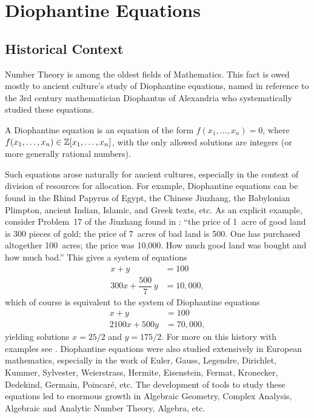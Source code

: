 \chapter{Diophantine Equations\label{ch:dioeq}}
\pagestyle{fancy}

\section{Historical Context}

Number Theory is among the oldest fields of Mathematics. This fact is owed mostly to ancient culture's study of Diophantine equations, named in reference to the 3rd century mathematician Diophantus of Alexandria who systematically studied these equations.


\begin{dfn}
A Diophantine equation is an equation of the form $f(x_1,\ldots,x_n)= 0$, where $f(x_1,\ldots,x_n) \in \mathbb{Z}[x_1,\ldots,x_n]$, with the only allowed solutions are integers (or more generally rational numbers).
\end{dfn}


Such equations arose naturally for ancient cultures, especially in the context of division of resources for allocation. For example, Diophantine equations can be found in the Rhind Papyrus of Egypt, the Chinese Jiuzhang, the Babylonian Plimpton, ancient Indian, Islamic, and Greek texts, etc. As an explicit example, consider Problem~17 of the Jiuzhang found in \cite{vogel68}: ``the price of 1~acre of good land is 300 pieces of gold; the price of 7~acres of bad land is 500. One has purchased altogether 100~acres; the price was 10,000. How much good land was bought and how much bad.'' This gives a system of equations
	\[
	\begin{aligned}
	x + y&= 100 \\
	300x + \dfrac{500}{7}\,y&= 10,000,
	\end{aligned}
	\]
which of course is equivalent to the system of Diophantine equations
	\[
	\begin{aligned}
	x + y&= 100 \\
	2100x + 500y&= 70,000,
	\end{aligned}
	\]
yielding solutions $x= 25/2$ and $y= 175/2$. For more on this history with examples see \cite{katz09}. Diophantine equations were also studied extensively in European mathematics, especially in the work of Euler, Gauss, Legendre, Dirichlet, Kummer, Sylvester, Weierstrass, Hermite, Eisenstein, Fermat, Kronecker, Dedekind, Germain, Poincar\'e, etc. The development of tools to study these equations led to enormous growth in Algebraic Geometry, Complex Analysis, Algebraic and Analytic Number Theory, Algebra, etc. 


